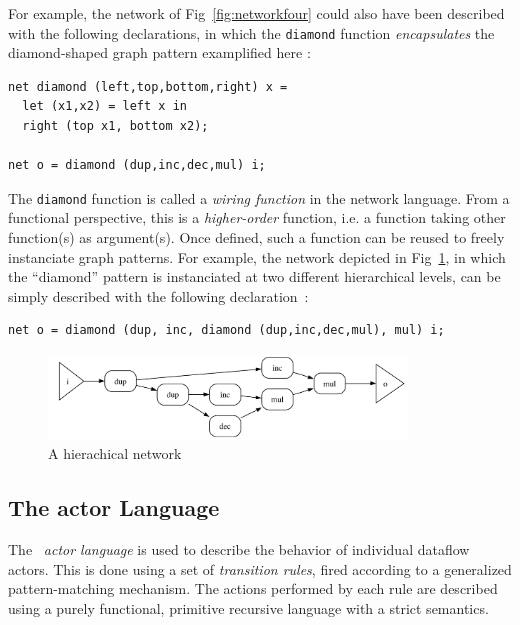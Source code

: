 For example, the network of Fig~\ref{fig:networkfour} could also have been described with the
following declarations, in which the \texttt{diamond} function \emph{encapsulates} the diamond-shaped graph
pattern examplified here :

\begin{lstlisting}[frame=single]
net diamond (left,top,bottom,right) x = 
  let (x1,x2) = left x in
  right (top x1, bottom x2);

net o = diamond (dup,inc,dec,mul) i;
\end{lstlisting}

The \texttt{diamond} function is called a \emph{wiring function} in the \caph network language. From a 
functional perspective, this is a \emph{higher-order} function, i.e. a function taking other
function(s) as argument(s). Once defined, such a function can be reused to freely instanciate graph
patterns. For example, the network depicted in Fig~\ref{fig:diamonds}, in which the ``diamond''
pattern is instanciated at two different hierarchical levels, can be simply described with the
following declaration~:

\begin{lstlisting}
net o = diamond (dup, inc, diamond (dup,inc,dec,mul), mul) i;
\end{lstlisting}

\begin{figure}[h]
\begin{center}
\includegraphics[width=0.85\textwidth]{figs/diamonds}
\caption{A hierachical network}
\label{fig:diamonds}
\end{center}
\end{figure}

\subsection{The actor Language}
\label{sec:actor-lang}

The \caph\ {\it actor language} is used to describe the behavior of individual dataflow actors. 
This is done using a set of \emph{transition rules}, fired according to a generalized
pattern-matching mechanism. The actions performed by each rule are described using a purely functional, primitive recursive
language with a strict semantics.

